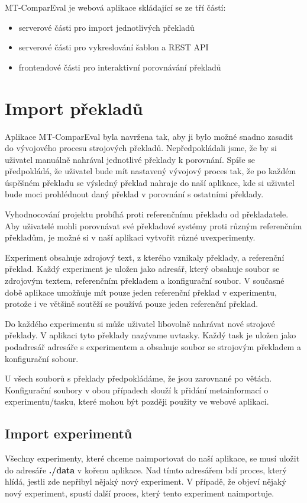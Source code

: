 MT-ComparEval je webová aplikace skládající se ze tří částí:

\begin{itemize}
	\item serverové části pro import jednotlivých překladů
	\item serverové části pro vykreslování šablon a REST API
	\item frontendové části pro interaktivní porovnávání překladů
\end{itemize}

\section{Import překladů}
Aplikace MT-ComparEval byla navržena tak,
  aby ji bylo možné snadno zasadit do vývojového procesu strojových překladů.
Nepředpokládali jsme,
  že by si uživatel manuálně nahrával jednotlivé překlady k porovnání.
Spíše se předpokládá, že uživatel bude mít nastavený vývojový proces tak,
  že po každém úspěšném překladu se výsledný překlad nahraje do naší aplikace,
  kde si uživatel bude moci prohlédnout daný překlad v porovnání s ostatními překlady.

Vyhodnocování projektu probíhá proti referenčnímu překladu od překladatele.
Aby uživatelé mohli porovnávat své překladové systémy proti různým referenčním překladům,
  je možné si v naší aplikaci vytvořit různé uv{experimenty}. 

Experiment obsahuje zdrojový text, z kterého vznikaly překlady, a referenční překlad.
Každý experiment je uložen jako adresář,
  který obsahuje soubor se zdrojovým textem, referenčním překladem
  a konfigurační soubor.
V současné době aplikace umožňuje mít pouze jeden referenční překlad v experimentu,
  protože i ve většině soutěží se používá pouze jeden referenční překlad.

Do každého experimentu si může uživatel libovolně nahrávat nové strojové překlady.
V aplikaci tyto překlady nazývame uv{tasky}.
Každý task je uložen jako podadresář adresáře s experimentem
  a obsahuje soubor se strojovým překladem
  a konfigurační sobour. 

U všech souborů s překlady předpokládáme, že jsou zarovnané po větách.
Konfigurační soubory v obou případech slouží k přidání metainformací o experimentu/tasku,
  které mohou být později použity ve webové aplikaci.

\subsection{Import experimentů}
Všechny experimenty, které chceme naimportovat do naší aplikace,
  se musí uložit do adresáře \textbf{./data} v kořenu aplikace.
Nad tímto adresářem bdí proces, který hlídá,
  jestli zde nepřibyl nějaký nový experiment.
V případě, že objeví nějaký nový experiment,
  spustí další proces, který tento experiment naimportuje.

